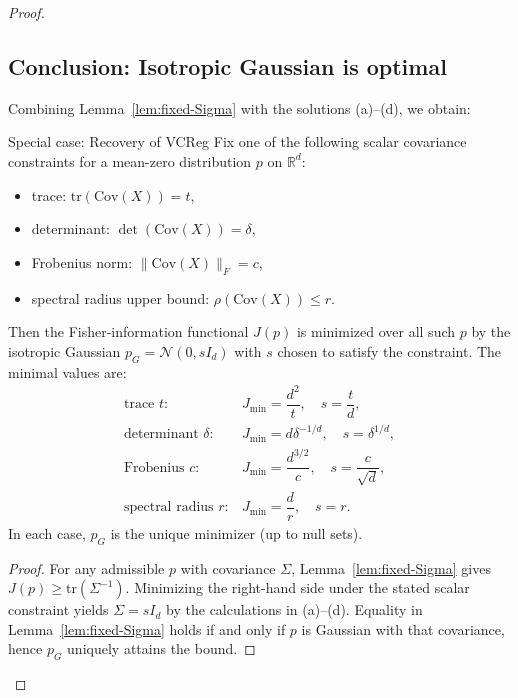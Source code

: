 \begin{proof}
\subsection*{Conclusion: Isotropic Gaussian is optimal}
Combining Lemma~\ref{lem:fixed-Sigma} with the solutions (a)--(d), we obtain:
\begin{theorem}[label={thm:isotropic-optimal}]{Special case: Recovery of VCReg}{}
Fix one of the following scalar covariance constraints for a mean-zero distribution $p$ on $\mathbb{R}^d$:
\begin{itemize}
\item trace: $\mathrm{tr}(\mathrm{Cov}(X))=t$,
\item determinant: $\det(\mathrm{Cov}(X))=\delta$,
\item Frobenius norm: $\|\mathrm{Cov}(X)\|_F=c$,
\item spectral radius upper bound: $\rho(\mathrm{Cov}(X))\le r$.
\end{itemize}
Then the Fisher-information functional $J(p)$ is minimized over all such $p$ by the isotropic Gaussian $p_G=\mathcal{N}(0,sI_d)$ with $s$ chosen to satisfy the constraint. The minimal values are:
\[
\begin{array}{ll}
\text{trace } t: & J_{\min}=\dfrac{d^2}{t},\quad s=\dfrac{t}{d},\\[1.2ex]
\text{determinant } \delta: & J_{\min}=d\delta^{-1/d},\quad s=\delta^{1/d},\\[1.2ex]
\text{Frobenius } c: & J_{\min}=\dfrac{d^{3/2}}{c},\quad s=\dfrac{c}{\sqrt{d}},\\[1.2ex]
\text{spectral radius } r: & J_{\min}=\dfrac{d}{r},\quad s=r.
\end{array}
\]
In each case, $p_G$ is the unique minimizer (up to null sets).
\end{theorem}
\begin{proof}
For any admissible $p$ with covariance $\Sigma$, Lemma~\ref{lem:fixed-Sigma} gives $J(p)\ge \mathrm{tr}(\Sigma^{-1})$. Minimizing the right-hand side under the stated scalar constraint yields $\Sigma=sI_d$ by the calculations in (a)--(d). Equality in Lemma~\ref{lem:fixed-Sigma} holds if and only if $p$ is Gaussian with that covariance, hence $p_G$ uniquely attains the bound.
\end{proof}
\end{proof}

